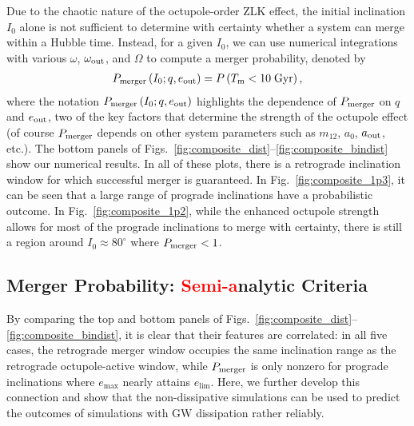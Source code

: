 \documentclass[
        fleqn,
        usenatbib,
    ]{mnras}
\newcommand*{\p}[1]{\left(#1\right)}
\begin{document}
Due to the chaotic nature of the octupole-order ZLK effect, the initial
inclination $I_0$ alone is not sufficient to determine with certainty whether a
system can merge within a Hubble time. Instead, for a given $I_0$, we can use
numerical integrations with various $\omega$, $\omega_{\rm out}$, and $\Omega$
to compute a merger probability, denoted by
\begin{align}
    P_{\rm merger}\p{I_0; q, e_{\rm out}} = P\p{T_{\rm m} < 10\;\mathrm{Gyr}},
        \label{eq:def_pmerge}
\end{align}
where the notation $P_{\rm merger}\p{I_0; q, e_{\rm out}}$ highlights the
dependence of $P_{\rm merger}$ on $q$ and $e_{\rm out}$, two of the key factors
that determine the strength of the octupole effect (of course $P_{\rm merger}$
depends on other system parameters such as $m_{12}$, $a_0$, $a_{\rm out}$,
etc.). The bottom panels of
Figs.~\ref{fig:composite_dist}--\ref{fig:composite_bindist} show our numerical
results. In all of these plots, there is a retrograde inclination window for
which successful merger is guaranteed. In Fig.~\ref{fig:composite_1p3}, it can
be seen that a large range of prograde inclinations have a probabilistic
outcome. In Fig.~\ref{fig:composite_1p2}, while the enhanced octupole strength
allows for most of the prograde inclinations to merge with certainty, there is
still a region around $I_0 \approx 80^\circ$ where $P_{\rm merger} < 1$.

\subsection{Merger Probability: \textcolor{red}{Semi-a}nalytic
Criteria}\label{ss:nogw_merger}

By comparing the top and bottom panels of
Figs.~\ref{fig:composite_dist}--\ref{fig:composite_bindist}, it is clear that
their features are correlated: in all five cases, the retrograde merger window
occupies the same inclination range as the retrograde octupole-active window,
while $P_{\rm merger}$ is only nonzero for prograde inclinations where
$e_{\max}$ nearly attains $e_{\lim}$. Here, we further develop this connection
and show that the non-dissipative simulations can be used to predict the
outcomes of simulations with GW dissipation rather reliably.
\end{document}
